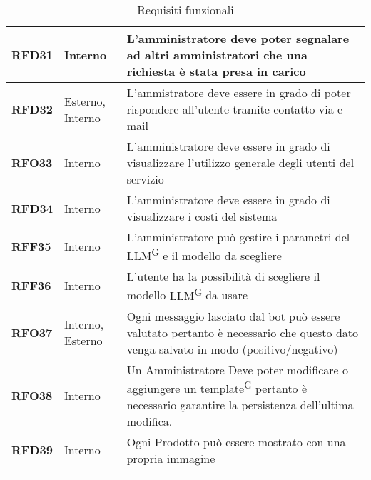 \begin{longtable}{|>{\centering\arraybackslash}m{}|>{\centering\arraybackslash}m{}|>{\arraybackslash}m{}|}
	\textbf{RFD31} & Interno & L'amministratore deve poter segnalare ad altri amministratori che una richiesta è stata presa in carico\\
	\hline
	\textbf{RFD32} & Esterno, Interno & L'ammistratore deve essere in grado di poter rispondere all'utente tramite contatto via e-mail\\
	\hline
	\textbf{RFO33} & Interno & L'amministratore deve essere in grado di visualizzare l'utilizzo generale degli utenti del servizio\\
	\hline
	\textbf{RFD34} & Interno & L'amministratore deve essere in grado di visualizzare i costi del sistema\\
	\hline
	\textbf{RFF35} & Interno & L'amministratore può gestire i parametri del \href{https://code7crusaders.github.io/docs/RTB/documentazione_interna/glossario.html#llm-large-language-model}{LLM\textsuperscript{G}} e il modello da scegliere\\
	\hline
	\textbf{RFF36} & Interno & L'utente ha la possibilità di scegliere il modello \href{https://code7crusaders.github.io/docs/RTB/documentazione_interna/glossario.html#llm-large-language-model}{LLM\textsuperscript{G}} da usare \\
	\textbf{RFO37} & Interno, Esterno & Ogni messaggio lasciato dal bot può essere valutato pertanto è necessario che questo dato venga salvato in modo (positivo/negativo)\\
	\hline 
	\textbf{RFO38} & Interno & Un Amministratore Deve poter modificare o aggiungere un \href{https://code7crusaders.github.io/docs/RTB/documentazione_interna/glossario.html#template}{template\textsuperscript{G}} pertanto è necessario garantire la persistenza dell'ultima modifica.\\
	\hline
	\textbf{RFD39} & Interno & Ogni Prodotto può essere mostrato con una propria immagine\\
	\hline
	\caption{Requisiti funzionali}
\end{longtable}

\pagebreak
